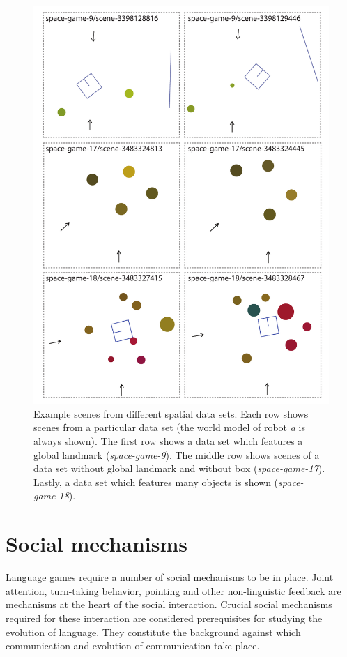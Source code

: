 \begin{figure}
\begin{center}
\includegraphics[width=.8\textwidth]{figs/spatial-scenes-overview-2}
\end{center}
\caption[Example scenes]{Example scenes from different 
spatial data sets. Each row shows 
scenes from a particular data set (the world model of 
robot \emph{a} is always shown). 
The first row shows a data set which features a global landmark 
(\emph{space-game-9}).
The middle row shows scenes of a data set without global landmark and
without box (\emph{space-game-17}). Lastly, a data set which features 
many objects is shown (\emph{space-game-18}).}
\label{f:spatial-scenes-2}
\end{figure}

\section{Social mechanisms}
\label{s:social-mechanisms}
Language games require a number of social mechanisms to be in place. Joint attention, 
turn-taking behavior, pointing and other non-linguistic feedback are mechanisms 
at the heart of the social interaction. Crucial social mechanisms required for these interaction 
are  considered prerequisites for studying the evolution of language. They constitute the 
background against which communication and evolution of communication take place.

